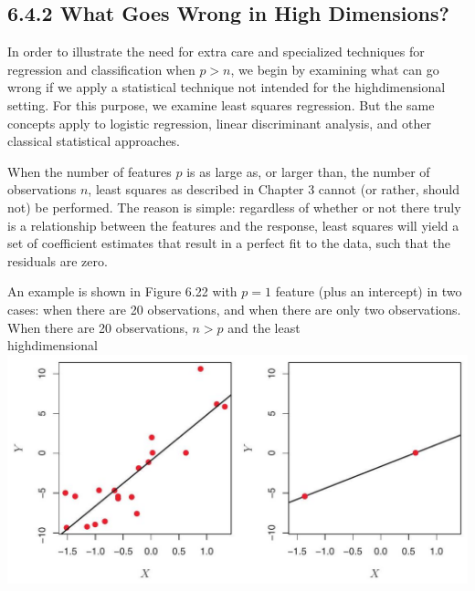 \documentclass[10pt]{article}
\begin{document}
\subsection*{6.4.2 What Goes Wrong in High Dimensions?}
In order to illustrate the need for extra care and specialized techniques for regression and classification when $p>n$, we begin by examining what can go wrong if we apply a statistical technique not intended for the highdimensional setting. For this purpose, we examine least squares regression. But the same concepts apply to logistic regression, linear discriminant analysis, and other classical statistical approaches.

When the number of features $p$ is as large as, or larger than, the number of observations $n$, least squares as described in Chapter 3 cannot (or rather, should not) be performed. The reason is simple: regardless of whether or not there truly is a relationship between the features and the response, least squares will yield a set of coefficient estimates that result in a perfect fit to the data, such that the residuals are zero.

An example is shown in Figure 6.22 with $p=1$ feature (plus an intercept) in two cases: when there are 20 observations, and when there are only two observations. When there are 20 observations, $n>p$ and the least\\
highdimensional\\
\includegraphics[max width=\textwidth, center]{2025_05_05_efe77898333945044de4g-255}
\end{document}
